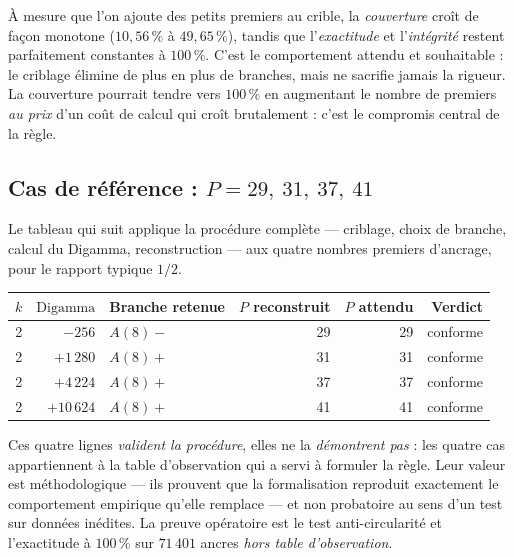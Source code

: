 \begin{boitenote}
À mesure que l'on ajoute des petits premiers au crible, la
\emph{couverture} croît de façon monotone ($10{,}56\,\%$ à $49{,}65\,\%$),
tandis que l'\emph{exactitude} et l'\emph{intégrité} restent
parfaitement constantes à $100\,\%$. C'est le comportement attendu et
souhaitable : le criblage élimine de plus en plus de branches, mais ne
sacrifie jamais la rigueur. La couverture pourrait tendre vers $100\,\%$
en augmentant le nombre de premiers \emph{au prix} d'un coût de calcul
qui croît brutalement : c'est le compromis central de la règle.
\end{boitenote}

\subsection{Cas de référence : $P = 29,\ 31,\ 37,\ 41$}

Le tableau qui suit applique la procédure complète --- criblage, choix
de branche, calcul du Digamma, reconstruction --- aux quatre nombres
premiers d'ancrage, pour le rapport typique $1/2$.

\begin{center}
\small
\begin{tabular}{@{}r r l r r r@{}}
\toprule
\rowcolor{spectralgris}
$k$ & $\mathrm{Digamma}$ & Branche retenue & $P$ reconstruit & $P$ attendu & Verdict \\
\midrule
2 & $-256$     & $A(8)-$ & 29 & 29 & conforme \\
2 & $+1\,280$  & $A(8)+$ & 31 & 31 & conforme \\
2 & $+4\,224$  & $A(8)+$ & 37 & 37 & conforme \\
2 & $+10\,624$ & $A(8)+$ & 41 & 41 & conforme \\
\bottomrule
\end{tabular}
\end{center}

\begin{boitealerte}
Ces quatre lignes \emph{valident la procédure}, elles ne la
\emph{démontrent pas} : les quatre cas appartiennent à la table
d'observation qui a servi à formuler la règle. Leur valeur est
méthodologique --- ils prouvent que la formalisation reproduit
exactement le comportement empirique qu'elle remplace --- et non
probatoire au sens d'un test sur données inédites. La preuve
opératoire est le test anti-circularité et l'exactitude à
$100\,\%$ sur $71\,401$ ancres \emph{hors table d'observation}.
\end{boitealerte}
